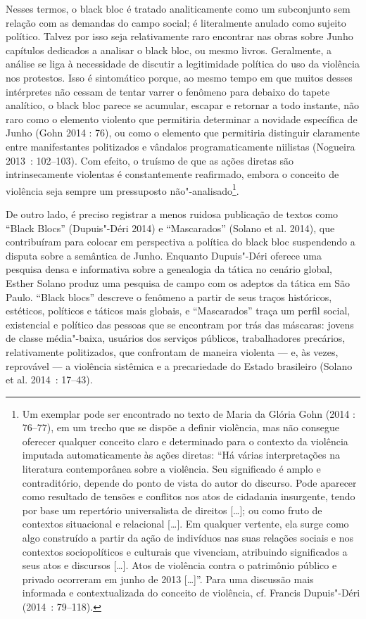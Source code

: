 Nesses termos, o black bloc é tratado
analiticamente como um subconjunto sem relação com as demandas do campo
social; é literalmente anulado como sujeito político. Talvez por isso
seja relativamente raro encontrar nas obras sobre Junho capítulos
dedicados a analisar o black bloc, ou mesmo livros. Geralmente, a
análise se liga à necessidade de discutir a legitimidade política do uso
da violência nos protestos. Isso é sintomático porque, ao mesmo tempo em
que muitos desses intérpretes não cessam de tentar varrer o fenômeno
para debaixo do tapete analítico, o black bloc parece se acumular,
escapar e retornar a todo instante, não raro como o elemento violento
que permitiria determinar a novidade específica de Junho (Gohn 2014 :
76), ou como o elemento que permitiria distinguir claramente entre
manifestantes politizados e vândalos programaticamente niilistas
(Nogueira 2013~: 102--103). Com efeito, o truísmo de que as ações diretas
são intrinsecamente violentas é constantemente reafirmado, embora o
conceito de violência seja sempre um pressuposto não"-analisado\footnote{Um
  exemplar pode ser encontrado no texto de Maria da Glória Gohn (2014 :
  76--77), em um trecho que se dispõe a definir violência, mas não
  consegue oferecer qualquer conceito claro e determinado para o
  contexto da violência imputada automaticamente às ações diretas: ``Há
  várias interpretações na literatura contemporânea sobre a violência.
  Seu significado é amplo e contraditório, depende do ponto de vista do
  autor do discurso. Pode aparecer como resultado de tensões e conflitos
  nos atos de cidadania insurgente, tendo por base um repertório
  universalista de direitos {[}\ldots{}{]}; ou como fruto de contextos
  situacional e relacional {[}\ldots{}{]}. Em qualquer vertente, ela
  surge como algo construído a partir da ação de indivíduos nas suas
  relações sociais e nos contextos sociopolíticos e culturais que
  vivenciam, atribuindo significados a seus atos e discursos
  {[}\ldots{}{]}. Atos de violência contra o patrimônio público e privado
  ocorreram em junho de 2013 {[}\ldots{}{]}''. Para uma discussão mais
  informada e contextualizada do conceito de violência, cf. Francis
  Dupuis"-Déri (2014~: 79--118).}.

De outro lado, é preciso registrar a menos ruidosa publicação de textos
como ``Black Blocs'' (Dupuis"-Déri 2014) e ``Mascarados'' (Solano et al.
2014), que contribuíram para colocar em perspectiva a política do black
bloc suspendendo a disputa sobre a semântica de Junho. Enquanto
Dupuis"-Déri oferece uma pesquisa densa e informativa sobre a genealogia
da tática no cenário global, Esther Solano produz uma pesquisa de campo
com os adeptos da tática em São Paulo. ``Black blocs'' descreve o
fenômeno a partir de seus traços históricos, estéticos, políticos e
táticos mais globais, e ``Mascarados'' traça um perfil social,
existencial e político das pessoas que se encontram por trás das
máscaras: jovens de classe média"-baixa, usuários dos serviços públicos,
trabalhadores precários, relativamente politizados, que confrontam de
maneira violenta --- e, às vezes, reprovável --- a violência sistêmica e a
precariedade do Estado brasileiro (Solano et al. 2014~: 17--43).


